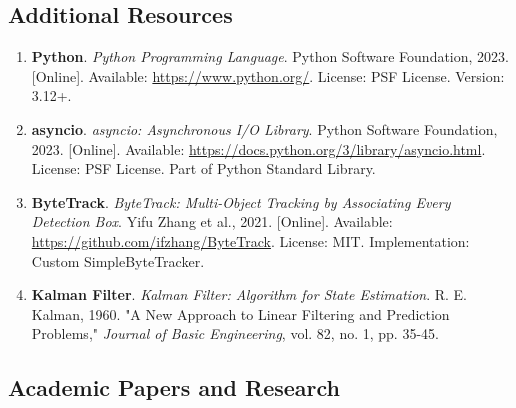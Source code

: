 \subsection*{Additional Resources}

\begin{enumerate}[resume]
    \item \textbf{Python}. \textit{Python Programming Language}. 
    Python Software Foundation, 2023. [Online]. Available: \url{https://www.python.org/}. 
    License: PSF License. Version: 3.12+.
    
    \item \textbf{asyncio}. \textit{asyncio: Asynchronous I/O Library}. 
    Python Software Foundation, 2023. [Online]. Available: \url{https://docs.python.org/3/library/asyncio.html}. 
    License: PSF License. Part of Python Standard Library.
    
    \item \textbf{ByteTrack}. \textit{ByteTrack: Multi-Object Tracking by Associating Every Detection Box}. 
    Yifu Zhang et al., 2021. [Online]. Available: \url{https://github.com/ifzhang/ByteTrack}. 
    License: MIT. Implementation: Custom SimpleByteTracker.
    
    \item \textbf{Kalman Filter}. \textit{Kalman Filter: Algorithm for State Estimation}. 
    R. E. Kalman, 1960. "A New Approach to Linear Filtering and Prediction Problems," 
    \textit{Journal of Basic Engineering}, vol. 82, no. 1, pp. 35-45.
\end{enumerate}


\subsection*{Academic Papers and Research}

